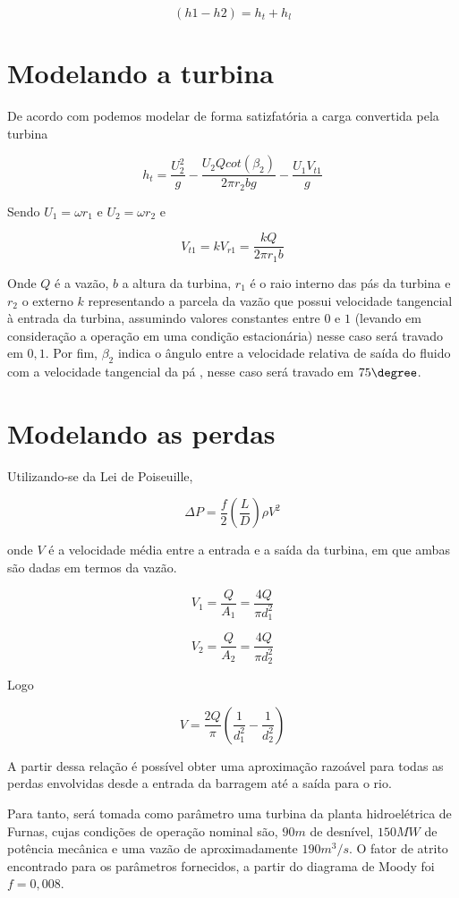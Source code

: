 \[(h1-h2) = h_t + h_l\]

\section{Modelando a turbina}

De acordo com \cite{hibbeler} podemos modelar de forma satizfatória a carga convertida pela turbina

\[h_t = \dfrac{U_2^2}{g} - \dfrac{U_2 Q cot(\beta_2)}{2\pi r_2 bg} - \dfrac{U_1 V_{t1}}{g}\]

Sendo $U_1 = \omega r_1$ e $U_2 = \omega r_2$ e

\[V_{t1} = kV_{r1} = \dfrac{kQ}{2\pi r_1 b}\]

Onde $Q$ é a vazão, $b$ a altura da turbina, $r_1$ é o raio interno das pás da turbina e $r_2$ o externo $k$ representando a parcela da vazão que possui velocidade tangencial à entrada da turbina, assumindo valores constantes entre $0$ e $1$ (levando em consideração a operação em uma condição estacionária) nesse caso será travado em $0,1$. Por fim, $\beta_2$ indica o ângulo entre a velocidade relativa de saída do fluido com a velocidade tangencial da pá , nesse caso será travado em $75\degree$.

\section{Modelando as perdas}

Utilizando-se da Lei de Poiseuille,

\[\Delta P = \dfrac{f}{2}\left(\dfrac{L}{D}\right)\rho V^2\]

onde $V$ é a velocidade média entre a entrada e a saída da turbina, em que ambas são dadas em termos da vazão.

\[V_1 = \dfrac{Q}{A_1} = \dfrac{4Q}{\pi d_1^2}\]

\[V_2 = \dfrac{Q}{A_2} = \dfrac{4Q}{\pi d_2^2}\]

Logo

\[V = \dfrac{2Q}{\pi}\left(\dfrac{1}{d_1^2} - \dfrac{1}{d_2^2}\right)\]

A partir dessa relação é possível obter uma aproximação razoável para todas as perdas envolvidas desde a entrada da barragem até a saída para o rio.

Para tanto, será tomada como parâmetro uma turbina da planta hidroelétrica de Furnas, cujas condições de operação nominal são, $90m$ de desnível, $150MW$ de potência mecânica e uma vazão de aproximadamente $190m^3/s$. O fator de atrito encontrado para os parâmetros fornecidos, a partir do diagrama de Moody foi $f = 0,008$.

